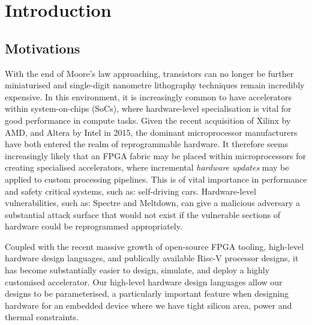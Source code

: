 \documentclass[a4paper,8pt]{report}
\begin{document}
\pagestyle{empty}
\singlespacing

\onehalfspacing

\singlespacing


\setcounter{page}{0}
\pagestyle{plain}
\tableofcontents
\listoffigures
\listoftables

\onehalfspacing


\chapter{Introduction}
\setcounter{page}{1} 
\section{Motivations}



With the end of Moore's law approaching, transistors can no longer be further
miniaturised and single-digit nanometre lithography techniques remain incredibly
expensive. In this environment, it is increasingly common to have accelerators
within system-on-chips (SoCs), where hardware-level specialisation is vital for
good performance in compute tasks. Given the recent acquisition of Xilinx by
AMD, and Altera by Intel in 2015, the dominant microprocessor manufacturers have
both entered the realm of reprogrammable hardware. It therefore seems
increasingly likely that an FPGA fabric may be placed within microprocessors for
creating specialised accelerators, where incremental \textit{hardware updates}
may be applied to custom processing pipelines. This is of vital importance in
performance and safety critical systems, such as: self-driving cars.
Hardware-level vulnerabilities, such as: Spectre and Meltdown, can give a
malicious adversary a substantial attack surface that would not exist if the
vulnerable sections of hardware could be reprogrammed appropriately.

Coupled with the recent massive growth of open-source FPGA tooling, high-level
hardware design languages, and publically available Risc-V processor designs, it
has become substantially easier to design, simulate, and deploy a highly
customised accelerator. Our high-level hardware design languages allow our
designs to be parameterised, a particularly important feature when designing
hardware for an embedded device where we have tight silicon area, power and
thermal constraints.
\end{document}
